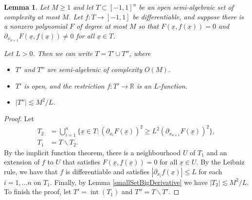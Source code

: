 \documentclass[letterpaper, reqno,11pt]{article}
\numberwithin{equation}{section}
\newcommand{\RR}{\mathbb{R}}
\numberwithin{thm}{section}
\newtheorem{lem}[thm]{Lemma}
\theoremstyle{remark}
\begin{document}


\begin{lem}\label{bigSmallNablaDecompLem}
Let $M\geq 1$ and let $T\subset[-1,1]^n$ be an open semi-algebraic set of complexity at most $M$. Let $f\colon T\to[-1,1]$ be differentiable, and suppose there is a nonzero polynomial $F$ of degree at most $M$ so that $F(\underline x, f(\underline x))=0$ and $\partial_{x_{n+1}}F(\underline x, f(\underline x))\neq 0$ for all $\underline x \in T$. 


Let $L>0$. Then we can write $T = T'\cup T''$, where
\begin{itemize}
\item[(i)] $T'$ and $T''$ are semi-algebraic of complexity $O(M)$. 
\item[(ii)] $T'$ is open, and the restriction $f\colon T'\to\RR$  is an $L$-function.
\item[(iii)] $|T''|\lesssim M^2/L$.
\end{itemize}
\end{lem}
%
\begin{proof}
Let
\begin{equation*}
\begin{split}
T_2 &= \bigcup_{i=1}^n \big\{ \underline x\in T\colon (\partial_{x_i} F(\underline x))^2\geq L^2(\partial_{x_{n+1}} F (\underline x))^2  \big\},\\
T_1 & =T\backslash T_2.
\end{split}
\end{equation*}
By the implicit function theorem, there is a neighbourhood $U$ of $T_1$ and an extension of $f$ to $U$ that satisfies $F(\underline x, f(\underline x))=0$ for all $\underline x\in U$. By the Leibniz rule, we have that $f$ is differentiable and satisfies $|\partial_{x_i}f(\underline x)|\leq L$ for each $i=1,\ldots n$ on $T_1$. Finally, by Lemma \ref{smallSetBigDerivative} we have $|T_2|\lesssim M^2/L$. To finish the proof, let $T'=\operatorname{int}(T_1)$ and $T'' = T\backslash T'$.
\end{proof}

\end{document}
